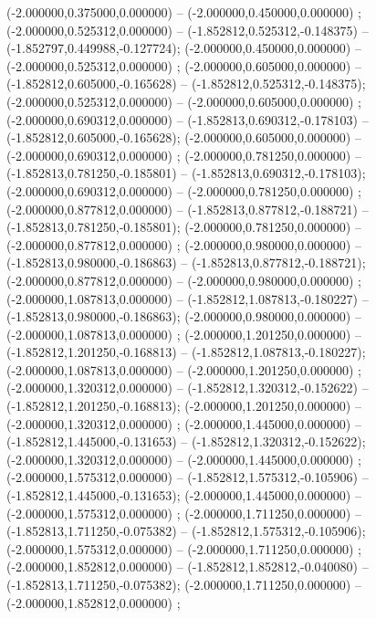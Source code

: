  (-2.000000,0.375000,0.000000) -- (-2.000000,0.450000,0.000000) ;
 (-2.000000,0.525312,0.000000) -- (-1.852812,0.525312,-0.148375) -- (-1.852797,0.449988,-0.127724);
 (-2.000000,0.450000,0.000000) -- (-2.000000,0.525312,0.000000) ;
 (-2.000000,0.605000,0.000000) -- (-1.852812,0.605000,-0.165628) -- (-1.852812,0.525312,-0.148375);
 (-2.000000,0.525312,0.000000) -- (-2.000000,0.605000,0.000000) ;
 (-2.000000,0.690312,0.000000) -- (-1.852813,0.690312,-0.178103) -- (-1.852812,0.605000,-0.165628);
 (-2.000000,0.605000,0.000000) -- (-2.000000,0.690312,0.000000) ;
 (-2.000000,0.781250,0.000000) -- (-1.852813,0.781250,-0.185801) -- (-1.852813,0.690312,-0.178103);
 (-2.000000,0.690312,0.000000) -- (-2.000000,0.781250,0.000000) ;
 (-2.000000,0.877812,0.000000) -- (-1.852813,0.877812,-0.188721) -- (-1.852813,0.781250,-0.185801);
 (-2.000000,0.781250,0.000000) -- (-2.000000,0.877812,0.000000) ;
 (-2.000000,0.980000,0.000000) -- (-1.852813,0.980000,-0.186863) -- (-1.852813,0.877812,-0.188721);
 (-2.000000,0.877812,0.000000) -- (-2.000000,0.980000,0.000000) ;
 (-2.000000,1.087813,0.000000) -- (-1.852812,1.087813,-0.180227) -- (-1.852813,0.980000,-0.186863);
 (-2.000000,0.980000,0.000000) -- (-2.000000,1.087813,0.000000) ;
 (-2.000000,1.201250,0.000000) -- (-1.852812,1.201250,-0.168813) -- (-1.852812,1.087813,-0.180227);
 (-2.000000,1.087813,0.000000) -- (-2.000000,1.201250,0.000000) ;
 (-2.000000,1.320312,0.000000) -- (-1.852812,1.320312,-0.152622) -- (-1.852812,1.201250,-0.168813);
 (-2.000000,1.201250,0.000000) -- (-2.000000,1.320312,0.000000) ;
 (-2.000000,1.445000,0.000000) -- (-1.852812,1.445000,-0.131653) -- (-1.852812,1.320312,-0.152622);
 (-2.000000,1.320312,0.000000) -- (-2.000000,1.445000,0.000000) ;
 (-2.000000,1.575312,0.000000) -- (-1.852812,1.575312,-0.105906) -- (-1.852812,1.445000,-0.131653);
 (-2.000000,1.445000,0.000000) -- (-2.000000,1.575312,0.000000) ;
 (-2.000000,1.711250,0.000000) -- (-1.852813,1.711250,-0.075382) -- (-1.852812,1.575312,-0.105906);
 (-2.000000,1.575312,0.000000) -- (-2.000000,1.711250,0.000000) ;
 (-2.000000,1.852812,0.000000) -- (-1.852812,1.852812,-0.040080) -- (-1.852813,1.711250,-0.075382);
 (-2.000000,1.711250,0.000000) -- (-2.000000,1.852812,0.000000) ;

